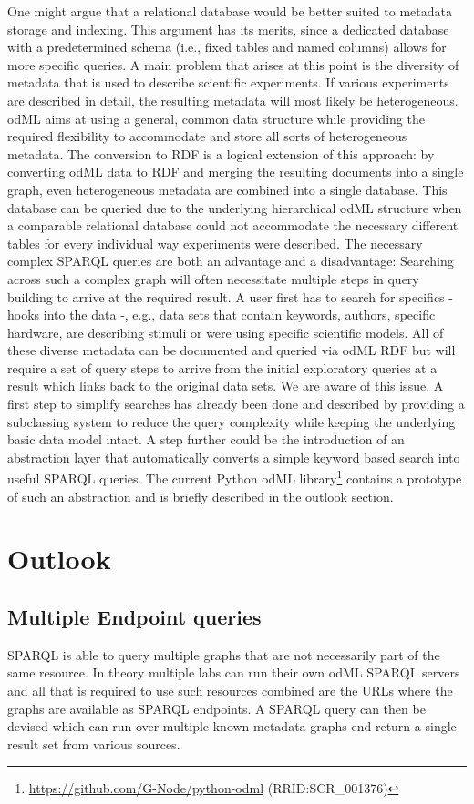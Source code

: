 \documentclass{article}
\begin{document}
One might argue that a relational database would be better suited to metadata storage and indexing. This argument has its merits, since a dedicated database with a predetermined schema (i.e., fixed tables and named columns) allows for more specific queries.
A main problem that arises at this point is the diversity of metadata that is used to describe scientific experiments. If various experiments are described in detail, the resulting metadata will most likely be heterogeneous. odML aims at using a general, common data structure while providing the required flexibility to accommodate and store all sorts of heterogeneous metadata. The conversion to RDF is a logical extension of this approach: by converting odML data to RDF and merging the resulting documents into a single graph, even heterogeneous metadata are combined into a single database. This database can be queried due to the underlying hierarchical odML structure when a comparable relational database could not accommodate the necessary different tables for every individual way experiments were described.
The necessary complex SPARQL queries are both an advantage and a disadvantage: Searching across such a complex graph will often necessitate multiple steps in query building to arrive at the required result. A user first has to search for specifics - hooks into the data -, e.g., data sets that contain keywords, authors, specific hardware, are describing stimuli or were using specific scientific models. All of these diverse metadata can be documented and queried via odML RDF but will require a set of query steps to arrive from the initial exploratory queries at a result which links back to the original data sets.
We are aware of this issue. A first step to simplify searches has already been done and described by providing a subclassing system to reduce the query complexity while keeping the underlying basic data model intact. A step further could be the introduction of an abstraction layer that automatically converts a simple keyword based search into useful SPARQL queries. The current Python odML library\footnote{\url{https://github.com/G-Node/python-odml} (RRID:SCR\_001376)} contains a prototype of such an abstraction and is briefly described in the outlook section.

\section{Outlook} \label{sec:outlook}
\subsection{Multiple Endpoint queries} \label{sec:outlook_endpoints}
SPARQL is able to query multiple graphs that are not necessarily part of the same resource. In theory multiple labs can run their own odML SPARQL servers and all that is required to use such resources combined are the URLs where the graphs are available as SPARQL endpoints. A SPARQL query can then be devised which can run over multiple known metadata graphs end return a single result set from various sources.
\end{document}
